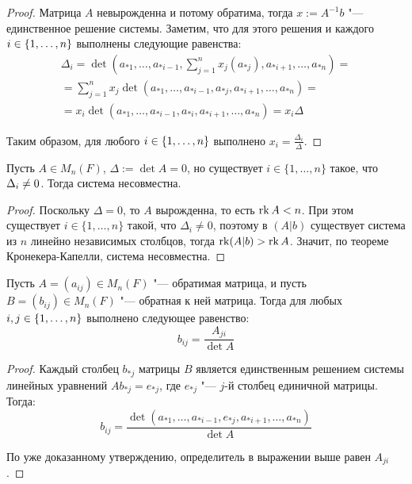 \begin{proof}
	Матрица $A$ невырожденна и потому обратима, тогда $x := A^{-1}b$ "--- единственное решение системы. Заметим, что для этого решения и каждого $i \in \{1, \dotsc, n\}$ выполнены следующие равенства:
	\begin{multline*}
		\Delta_i = \det\left(a_{*1},\dots,a_{*i-1},\sum_{j = 1}^{n}x_j(a_{*j}),a_{*i+1},\dots,a_{*n}\right) =
		\\
		= \sum_{j = 1}^{n}x_j\det\left(a_{*1},\dots,a_{*i-1},a_{*j},a_{*i+1},\dots,a_{*n}\right)
		=
		\\
		=
		x_i\det\left(a_{*1},\dots,a_{*i-1},a_{*i},a_{*i+1},\dots,a_{*n}\right) = x_i\Delta
	\end{multline*}
	
	Таким образом, для любого $i \in \{1, \dotsc, n\}$ выполнено $x_i = \frac{\Delta_i}{\Delta}$.
\end{proof}

\begin{proposition}
	Пусть $A \in M_n(F)$, $\Delta := \det{A} = 0$, но существует $i \in \{1, \dots, n\}$ такое, что $\Delta_i \hm{\ne} 0$. Тогда система несовместна.
\end{proposition}

\begin{proof}
	Поскольку $\Delta = 0$, то $A$ вырожденна, то есть $\operatorname{rk}{A} < n$. При этом существует $i \in \{1, \dots, n\}$ такой, что $\Delta_i \ne 0$, поэтому в $(A|b)$ существует система из $n$ линейно независимых столбцов, тогда $\operatorname{rk}(A|b) > \operatorname{rk}{A}$. Значит, по теореме Кронекера-Капелли, система несовместна.
\end{proof}

\begin{corollary}
	Пусть $A = (a_{ij}) \in M_n(F)$ "--- обратимая матрица, и пусть $B = (b_{ij}) \in M_n(F)$ "--- обратная к ней матрица. Тогда для любых $i, j \in \{1, \dotsc, n\}$ выполнено следующее равенство:
	\[b_{ij} = \frac{A_{ji}}{\det{A}}\]
\end{corollary}

\begin{proof}
	Каждый столбец $b_{*j}$ матрицы $B$ является единственным решением системы линейных уравнений $Ab_{*j} = e_{*j}$, где $e_{*j}$ "--- $j$-й столбец единичной матрицы. Тогда:
	\[b_{ij} = \frac{\det(a_{*1}, \dots, a_{*i-1},e_{*j},a_{*i+1}, \dots, a_{*n})}{\det{A}}\]
	
	По уже доказанному утверждению, определитель в выражении выше равен $A_{ji}$.
\end{proof}

